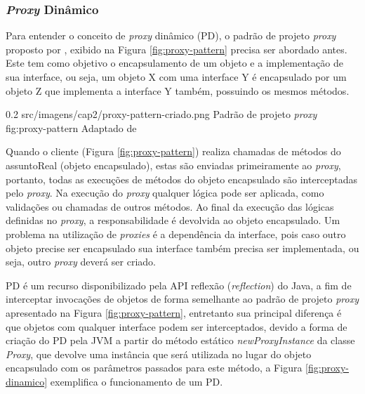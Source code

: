 \subsubsection{\textit{Proxy} Dinâmico}

\par Para entender o conceito de \textit{proxy} dinâmico (PD), o padrão de projeto \textit{proxy} proposto por , exibido na Figura \ref{fig:proxy-pattern} precisa ser abordado antes. Este tem como objetivo o encapsulamento de um objeto e a implementação de sua interface, ou seja, um objeto X com uma interface Y é encapsulado por um objeto Z que implementa a interface Y também, possuindo os mesmos métodos.

\begin{image}
{0.2} %
{src/imagens/cap2/proxy-pattern-criado.png} %
{Padrão de projeto \textit{proxy}} %
{fig:proxy-pattern} %
{Adaptado de \cite{gamma1995design}} %
\end{image}


\par Quando o cliente (Figura \ref{fig:proxy-pattern}) realiza chamadas de métodos do assuntoReal (objeto encapsulado), estas são enviadas primeiramente ao \textit{proxy}, 
portanto, todas as execuções de métodos do objeto encapsulado são interceptadas pelo \textit{proxy}. Na execução do \textit{proxy} qualquer lógica pode ser aplicada, como validações ou chamadas de outros métodos. Ao final da execução das lógicas definidas no \textit{proxy}, a responsabilidade é devolvida ao objeto encapsulado. Um problema na utilização de \textit{proxies} é a dependência da interface, pois caso outro objeto precise ser encapsulado sua interface também precisa ser implementada, ou seja, outro \textit{proxy} deverá ser criado.

\par PD é um recurso disponibilizado pela API reflexão (\textit{reflection}) do Java, a fim de interceptar invocações de objetos de forma semelhante ao padrão de projeto \textit{proxy} apresentado na Figura \ref{fig:proxy-pattern}, entretanto sua principal diferença é que objetos com qualquer interface podem ser interceptados, devido a forma de criação do PD pela JVM a partir do método estático \textit{newProxyInstance} da classe \textit{Proxy}, que devolve uma instância que será utilizada no lugar do objeto encapsulado com os parâmetros passados para este método, a Figura \ref{fig:proxy-dinamico} exemplifica o funcionamento de um PD. 

